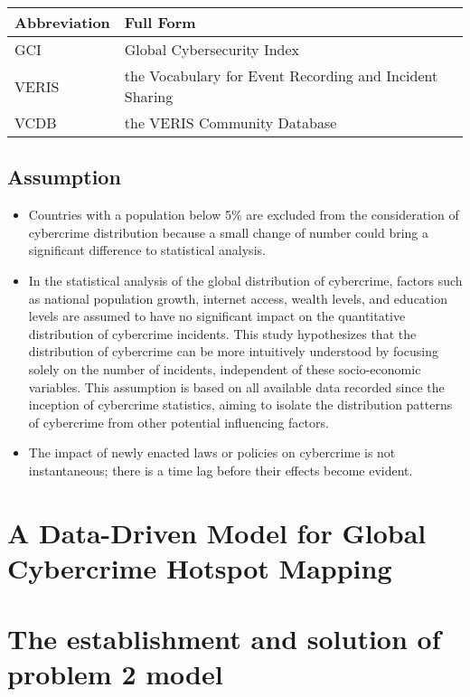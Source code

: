 \documentclass[12pt]{article}
\begin{document}
		\medskip

		\noindent
		\begin{tabular}{ll}
			\textbf{Abbreviation} & \textbf{Full Form} \\
			\hline
			GCI   & Global Cybersecurity Index\cite{gci-2024} \\
			\hline
			VERIS & the Vocabulary for Event Recording and Incident Sharing\cite{veris} \\
			\hline
			VCDB  & the VERIS Community Database\cite{vcdb} \\
			\hline
		\end{tabular}
	\subsection{Assumption}\label{subsec:assumption} %
		\begin{itemize}
			\item Countries with a population below 5\% are excluded from the consideration of cybercrime distribution because
				a small change of number could bring a significant difference to statistical analysis.
			\item In the statistical analysis of the global distribution of cybercrime,
				factors such as national population growth, internet access, wealth levels, and education levels
				are assumed to have no significant impact on the quantitative distribution of cybercrime incidents.
				This study hypothesizes that the distribution of cybercrime can be more intuitively understood by focusing solely on the number of incidents,
				independent of these socio-economic variables.
				This assumption is based on all available data recorded since the inception of cybercrime statistics,
				aiming to isolate the distribution patterns of cybercrime from other potential influencing factors.
			\item The impact of newly enacted laws or policies on cybercrime is not instantaneous;
				there is a time lag before their effects become evident.
		\end{itemize}

\section{A Data-Driven Model for Global Cybercrime Hotspot Mapping}\label{sec:a-data-driven-model-for-global-cybercrime-hotspot-mapping}


\section{The establishment and solution of problem 2 model}\label{sec:the-establishment-and-solution-of-problem-2-model} %
	
\end{document}
